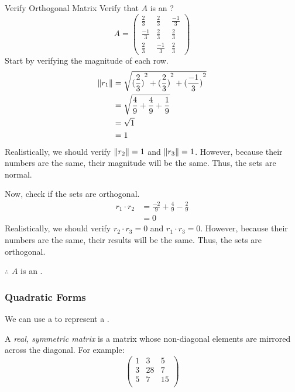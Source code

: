 \begin{example}{Verify Orthogonal Matrix}
  Verify that $A$ is an ?
  \begin{equation*}
    A =
    \begin{pmatrix}
      \frac{2}{3} & \frac{2}{3} & \frac{-1}{3} \\
      \frac{-1}{3} & \frac{2}{3} & \frac{2}{3} \\
      \frac{2}{3} & \frac{-1}{3} & \frac{2}{3}
    \end{pmatrix}
  \end{equation*}
  \tcblower{}
  Start by verifying the magnitude of each row.
  \begin{align*}
    \lVert r_{1} \rVert &= \sqrt{{(\frac{2}{3})}^{2} + {(\frac{2}{3})}^{2} + {(\frac{-1}{3})}^{2}} \\
                      &= \sqrt{\frac{4}{9} + \frac{4}{9} + \frac{1}{9}} \\
                      &= \sqrt{1} \\
                      &= 1
  \end{align*}
  Realistically, we should verify $\lVert r_{2} \rVert = 1$ and $\lVert r_{3} \rVert = 1$.
  However, because their numbers are the same, their magnitude will be the same.
  Thus, the sets are normal.

  Now, check if the sets are orthogonal.
  \begin{align*}
    r_{1} \cdot r_{2} &= \frac{-2}{9} + \frac{4}{9} - \frac{2}{9} \\
                     &= 0
  \end{align*}
  Realistically, we should verify $r_{2} \cdot r_{3} = 0$ and $r_{1} \cdot r_{3} = 0$.
  However, because their numbers are the same, their results will be the same.
  Thus, the sets are orthogonal.

  $\therefore$ $A$ is an .
\end{example}

\subsubsection{Quadratic Forms}\label{subsubsec:Quadratic_Forms}
We can use a  to represent a .

\begin{definition}\label{def:Real_Symmetric_Matrix}
  A \emph{real, symmetric matrix} is a matrix whose non-diagonal elements are mirrored across the diagonal.
  For example:
  \begin{equation*}
    \begin{pmatrix}
      1 & 3 & 5 \\
      3 & 28 & 7 \\
      5 & 7 & 15 \\
    \end{pmatrix}
  \end{equation*}
\end{definition}

